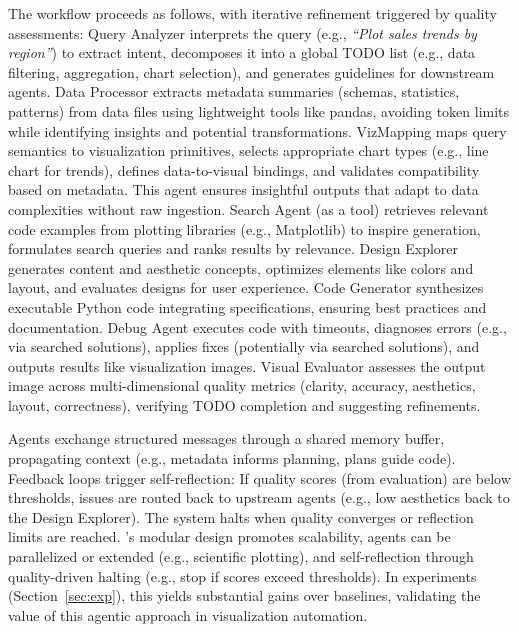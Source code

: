 The workflow proceeds as follows, with iterative refinement triggered by quality assessments: Query Analyzer interprets the query (e.g., \textit{``Plot sales trends by region''}) to extract intent, decomposes it into a global TODO list (e.g., data filtering, aggregation, chart selection), and generates guidelines for downstream agents. Data Processor extracts metadata summaries (schemas, statistics, patterns) from data files using lightweight tools like pandas, avoiding token limits while identifying insights and potential transformations. 
VizMapping maps query semantics to visualization primitives, selects appropriate chart types (e.g., line chart for trends), defines data-to-visual bindings, and validates compatibility based on metadata. This agent ensures insightful outputs that adapt to data complexities without raw ingestion.
Search Agent (as a tool) retrieves relevant code examples from plotting libraries (e.g., Matplotlib) to inspire generation, formulates search queries and ranks results by relevance. Design Explorer generates content and aesthetic concepts, optimizes elements like colors and layout, and evaluates designs for user experience. Code Generator synthesizes executable Python code integrating specifications, ensuring best practices and documentation. Debug Agent executes code with timeouts, diagnoses errors (e.g., via searched solutions), applies fixes (potentially via searched solutions), and outputs results like visualization images. Visual Evaluator assesses the output image across multi-dimensional quality metrics (clarity, accuracy, aesthetics, layout, correctness), verifying TODO completion and suggesting refinements.

Agents exchange structured messages through a shared memory buffer, propagating context (e.g., metadata informs planning, plans guide code). Feedback loops trigger self-reflection: If quality scores (from evaluation) are below thresholds, issues are routed back to upstream agents (e.g., low aesthetics back to the Design Explorer). The system halts when quality converges or reflection limits are reached.
\methodname{}'s modular design promotes scalability, agents can be parallelized or extended (e.g., scientific plotting), and self-reflection through quality-driven halting (e.g., stop if scores exceed thresholds). In experiments (Section~\ref{sec:exp}), this yields substantial gains over baselines, validating the value of this agentic approach in visualization automation.



